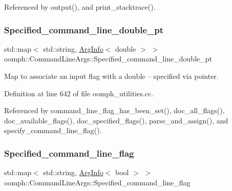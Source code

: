 Referenced by output(), and print\+\_\+stacktrace().

\mbox{\label{namespaceoomph_1_1CommandLineArgs_aa4decec3dde9efd1b7e2e447fe656f41}} 
\subsubsection{\texorpdfstring{Specified\+\_\+command\+\_\+line\+\_\+double\+\_\+pt}{Specified\_command\_line\_double\_pt}}
{\footnotesize\ttfamily std\+::map$<$ std\+::string, \hyperlink{structoomph_1_1CommandLineArgs_1_1ArgInfo}{Arg\+Info}$<$ double $>$ $>$ oomph\+::\+Command\+Line\+Args\+::\+Specified\+\_\+command\+\_\+line\+\_\+double\+\_\+pt}



Map to associate an input flag with a double -- specified via pointer. 



Definition at line 642 of file oomph\+\_\+utilities.\+cc.



Referenced by command\+\_\+line\+\_\+flag\+\_\+has\+\_\+been\+\_\+set(), doc\+\_\+all\+\_\+flags(), doc\+\_\+available\+\_\+flags(), doc\+\_\+specified\+\_\+flags(), parse\+\_\+and\+\_\+assign(), and specify\+\_\+command\+\_\+line\+\_\+flag().

\mbox{\label{namespaceoomph_1_1CommandLineArgs_a26248b14a69e0839c647c5c9540a09b3}} 
\subsubsection{\texorpdfstring{Specified\+\_\+command\+\_\+line\+\_\+flag}{Specified\_command\_line\_flag}}
{\footnotesize\ttfamily std\+::map$<$ std\+::string, \hyperlink{structoomph_1_1CommandLineArgs_1_1ArgInfo}{Arg\+Info}$<$ bool $>$ $>$ oomph\+::\+Command\+Line\+Args\+::\+Specified\+\_\+command\+\_\+line\+\_\+flag}



